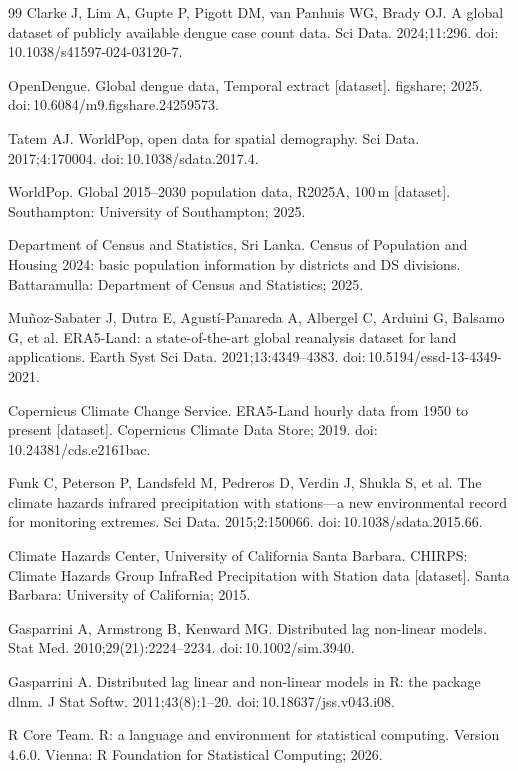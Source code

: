 \documentclass[11pt,a4paper]{article}
\begin{document}
\begin{thebibliography}{99}
 Clarke J, Lim A, Gupte P, Pigott DM, van Panhuis WG, Brady OJ. A global dataset of publicly available dengue case count data. Sci Data. 2024;11:296. doi:\,10.1038/s41597-024-03120-7.

 OpenDengue. Global dengue data, Temporal extract [dataset]. figshare; 2025. doi:\,10.6084/m9.figshare.24259573.

 Tatem AJ. WorldPop, open data for spatial demography. Sci Data. 2017;4:170004. doi:\,10.1038/sdata.2017.4.

 WorldPop. Global 2015--2030 population data, R2025A, 100\,m [dataset]. Southampton: University of Southampton; 2025.

 Department of Census and Statistics, Sri Lanka. Census of Population and Housing 2024: basic population information by districts and DS divisions. Battaramulla: Department of Census and Statistics; 2025.

 Mu\~noz-Sabater J, Dutra E, Agust\'i-Panareda A, Albergel C, Arduini G, Balsamo G, et al. ERA5-Land: a state-of-the-art global reanalysis dataset for land applications. Earth Syst Sci Data. 2021;13:4349--4383. doi:\,10.5194/essd-13-4349-2021.

 Copernicus Climate Change Service. ERA5-Land hourly data from 1950 to present [dataset]. Copernicus Climate Data Store; 2019. doi:\,10.24381/cds.e2161bac.

 Funk C, Peterson P, Landsfeld M, Pedreros D, Verdin J, Shukla S, et al. The climate hazards infrared precipitation with stations---a new environmental record for monitoring extremes. Sci Data. 2015;2:150066. doi:\,10.1038/sdata.2015.66.

 Climate Hazards Center, University of California Santa Barbara. CHIRPS: Climate Hazards Group InfraRed Precipitation with Station data [dataset]. Santa Barbara: University of California; 2015.

 Gasparrini A, Armstrong B, Kenward MG. Distributed lag non-linear models. Stat Med. 2010;29(21):2224--2234. doi:\,10.1002/sim.3940.

 Gasparrini A. Distributed lag linear and non-linear models in R: the package dlnm. J Stat Softw. 2011;43(8):1--20. doi:\,10.18637/jss.v043.i08.

 R Core Team. R: a language and environment for statistical computing. Version 4.6.0. Vienna: R Foundation for Statistical Computing; 2026.


\end{thebibliography}
\end{document}
